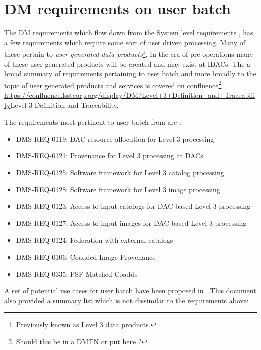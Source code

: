 \section{DM requirements on user batch} \label{sec:requirements}

The DM requirements  which flow down from the System level requirements ,
has  a few requirements which require some sort of user driven processing.
Many of these pertain to {\em user generated data products}\footnote{Previously known as Level 3 data products.}.
In the era of pre-operations many of these user generated products will be created and may exist at IDACs.
The a broad summary of requirements pertaining to user batch and more broadly to the topic of user generated products and services is covered on confluence\footnote{Should this be in a DMTN or put here ?} \url{https://confluence.lsstcorp.org/display/DM/Level+3+Definition+and+Traceability}{Level 3 Definition and Traceability}.

The requirements most pertinent to user batch from \cite{LSE-61} are :

\begin{itemize}
\item DMS-REQ-0119: DAC resource allocation for Level 3 processing
\item DMS-REQ-0121: Provenance for Level 3 processing at DACs
\item DMS-REQ-0125: Software framework for Level 3 catalog processing
\item DMS-REQ-0128: Software framework for Level 3 image processing
\item DMS-REQ-0123: Access to input catalogs for DAC-based Level 3 processing
\item DMS-REQ-0127: Access to input images for DAC-based Level 3 processing
\item DMS-REQ-0124: Federation with external catalogs
\item DMS-REQ-0106: Coadded Image Provenance
\item DMS-REQ-0335: PSF-Matched Coadds
\end{itemize}


A set of potential use cases for user batch have been proposed in .
This document also provided a summary list which is not dissimilar to the requirements above:

